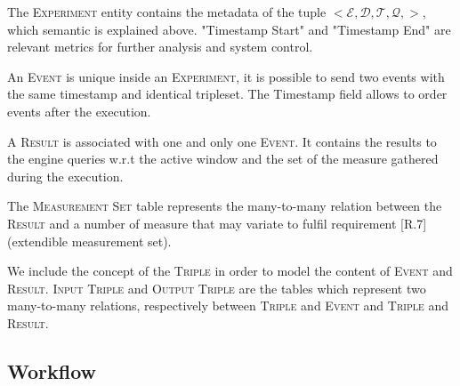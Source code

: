 

The \textsc{Experiment} entity contains the metadata of the tuple $<\mathcal{E},\mathcal{D},\mathcal{T},\mathcal{Q},>$, which semantic is explained above. "Timestamp Start" and "Timestamp End" are relevant metrics for further analysis and system control. 

An \textsc{Event} is unique inside an \textsc{Experiment}, it is possible to send two events with the same timestamp and identical tripleset. The Timestamp field allows to order events after the execution.

A \textsc{Result} is associated with one and only one \textsc{Event}. It contains the results to the engine queries w.r.t the active window and the set of the measure gathered during the execution. 

The \textsc{Measurement Set} table represents the many-to-many relation between the \textsc{Result} and a number of measure that may variate  to fulfil requirement [R.7] (extendible measurement set). 

We include the concept of the \textsc{Triple} in order to model the content of \textsc{Event} and \textsc{Result}. \textsc{Input Triple} and \textsc{Output Triple} are the tables which represent two many-to-many relations, respectively between \textsc{Triple} and \textsc{Event} and \textsc{Triple}  and \textsc{Result}.

\subsection{Workflow}\label{sec:test-stand-workflow}

